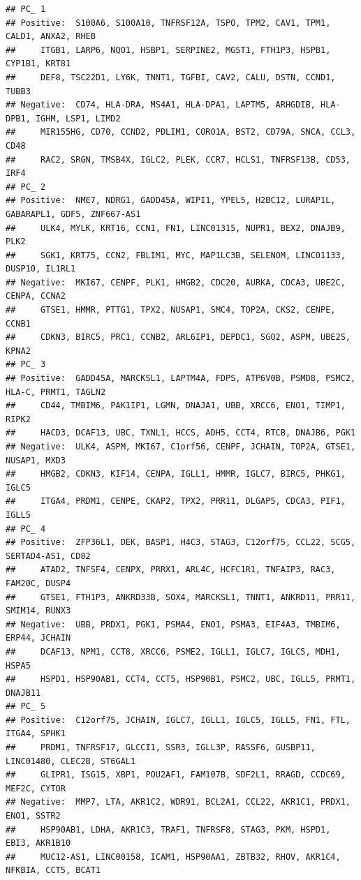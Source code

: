 \documentclass[
]{book}
\begin{document}
\begin{verbatim}
## PC_ 1 
## Positive:  S100A6, S100A10, TNFRSF12A, TSPO, TPM2, CAV1, TPM1, CALD1, ANXA2, RHEB 
##     ITGB1, LARP6, NQO1, HSBP1, SERPINE2, MGST1, FTH1P3, HSPB1, CYP1B1, KRT81 
##     DEF8, TSC22D1, LY6K, TNNT1, TGFBI, CAV2, CALU, DSTN, CCND1, TUBB3 
## Negative:  CD74, HLA-DRA, MS4A1, HLA-DPA1, LAPTM5, ARHGDIB, HLA-DPB1, IGHM, LSP1, LIMD2 
##     MIR155HG, CD70, CCND2, PDLIM1, CORO1A, BST2, CD79A, SNCA, CCL3, CD48 
##     RAC2, SRGN, TMSB4X, IGLC2, PLEK, CCR7, HCLS1, TNFRSF13B, CD53, IRF4 
## PC_ 2 
## Positive:  NME7, NDRG1, GADD45A, WIPI1, YPEL5, H2BC12, LURAP1L, GABARAPL1, GDF5, ZNF667-AS1 
##     ULK4, MYLK, KRT16, CCN1, FN1, LINC01315, NUPR1, BEX2, DNAJB9, PLK2 
##     SGK1, KRT75, CCN2, FBLIM1, MYC, MAP1LC3B, SELENOM, LINC01133, DUSP10, IL1RL1 
## Negative:  MKI67, CENPF, PLK1, HMGB2, CDC20, AURKA, CDCA3, UBE2C, CENPA, CCNA2 
##     GTSE1, HMMR, PTTG1, TPX2, NUSAP1, SMC4, TOP2A, CKS2, CENPE, CCNB1 
##     CDKN3, BIRC5, PRC1, CCNB2, ARL6IP1, DEPDC1, SGO2, ASPM, UBE2S, KPNA2 
## PC_ 3 
## Positive:  GADD45A, MARCKSL1, LAPTM4A, FDPS, ATP6V0B, PSMD8, PSMC2, HLA-C, PRMT1, TAGLN2 
##     CD44, TMBIM6, PAK1IP1, LGMN, DNAJA1, UBB, XRCC6, ENO1, TIMP1, RIPK2 
##     HACD3, DCAF13, UBC, TXNL1, HCCS, ADH5, CCT4, RTCB, DNAJB6, PGK1 
## Negative:  ULK4, ASPM, MKI67, C1orf56, CENPF, JCHAIN, TOP2A, GTSE1, NUSAP1, MXD3 
##     HMGB2, CDKN3, KIF14, CENPA, IGLL1, HMMR, IGLC7, BIRC5, PHKG1, IGLC5 
##     ITGA4, PRDM1, CENPE, CKAP2, TPX2, PRR11, DLGAP5, CDCA3, PIF1, IGLL5 
## PC_ 4 
## Positive:  ZFP36L1, DEK, BASP1, H4C3, STAG3, C12orf75, CCL22, SCG5, SERTAD4-AS1, CD82 
##     ATAD2, TNFSF4, CENPX, PRRX1, ARL4C, HCFC1R1, TNFAIP3, RAC3, FAM20C, DUSP4 
##     GTSE1, FTH1P3, ANKRD33B, SOX4, MARCKSL1, TNNT1, ANKRD11, PRR11, SMIM14, RUNX3 
## Negative:  UBB, PRDX1, PGK1, PSMA4, ENO1, PSMA3, EIF4A3, TMBIM6, ERP44, JCHAIN 
##     DCAF13, NPM1, CCT8, XRCC6, PSME2, IGLL1, IGLC7, IGLC5, MDH1, HSPA5 
##     HSPD1, HSP90AB1, CCT4, CCT5, HSP90B1, PSMC2, UBC, IGLL5, PRMT1, DNAJB11 
## PC_ 5 
## Positive:  C12orf75, JCHAIN, IGLC7, IGLL1, IGLC5, IGLL5, FN1, FTL, ITGA4, SPHK1 
##     PRDM1, TNFRSF17, GLCCI1, SSR3, IGLL3P, RASSF6, GUSBP11, LINC01480, CLEC2B, ST6GAL1 
##     GLIPR1, ISG15, XBP1, POU2AF1, FAM107B, SDF2L1, RRAGD, CCDC69, MEF2C, CYTOR 
## Negative:  MMP7, LTA, AKR1C2, WDR91, BCL2A1, CCL22, AKR1C1, PRDX1, ENO1, SSTR2 
##     HSP90AB1, LDHA, AKR1C3, TRAF1, TNFRSF8, STAG3, PKM, HSPD1, EBI3, AKR1B10 
##     MUC12-AS1, LINC00158, ICAM1, HSP90AA1, ZBTB32, RHOV, AKR1C4, NFKBIA, CCT5, BCAT1
\end{verbatim}
\end{document}
